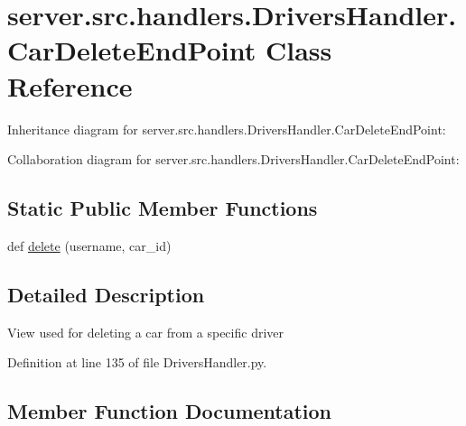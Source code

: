 \hypertarget{classserver_1_1src_1_1handlers_1_1_drivers_handler_1_1_car_delete_end_point}{}\section{server.\+src.\+handlers.\+Drivers\+Handler.\+Car\+Delete\+End\+Point Class Reference}
\label{classserver_1_1src_1_1handlers_1_1_drivers_handler_1_1_car_delete_end_point}


Inheritance diagram for server.\+src.\+handlers.\+Drivers\+Handler.\+Car\+Delete\+End\+Point\+:


Collaboration diagram for server.\+src.\+handlers.\+Drivers\+Handler.\+Car\+Delete\+End\+Point\+:
\subsection*{Static Public Member Functions}
\begin{DoxyCompactItemize}
\item 
def \hyperlink{classserver_1_1src_1_1handlers_1_1_drivers_handler_1_1_car_delete_end_point_a7e6a36761e4e2b86a87077f4e6d9a13e}{delete} (username, car\+\_\+id)
\end{DoxyCompactItemize}


\subsection{Detailed Description}
\begin{DoxyVerb}View used for deleting a car from a specific driver\end{DoxyVerb}
 

Definition at line 135 of file Drivers\+Handler.\+py.



\subsection{Member Function Documentation}
